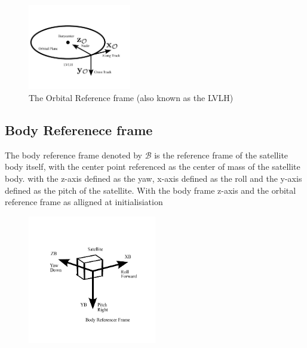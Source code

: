 \begin{figure}[H]
    \centering
    \includegraphics[width=0.4\textwidth]{figures/modelling/LVLH.pdf}
    \caption{The Orbital Reference frame (also known as the LVLH)}
    \label{fig:3.6}
\end{figure}

\subsection{Body Referenece frame}

The body reference frame denoted by $\mathcal{B}$ is the reference frame of the satellite body itself, with the center point referenced as the center of mass of the satellite body.
with the z-axis defined as the yaw, x-axis defined as the roll and the y-axis defined as the pitch of the satellite. With the body frame z-axis and the orbital reference frame 
as alligned at initialisiation


\begin{figure}[H]
    \centering
    \includegraphics[width=0.5\textwidth]{figures/modelling/BRF.pdf}
    \caption{}
    \label{fig:BRF}
\end{figure}





